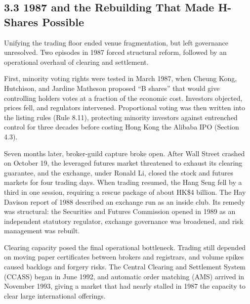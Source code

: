 \documentclass[11pt,letterpaper]{article}
\begin{document}
\subsection*{\texorpdfstring{3.3 1987 and the Rebuilding That Made H-Shares Possible}{3.3 1987 and the Rebuilding That Made H-Shares Possible}}
Unifying the trading floor ended venue fragmentation, but left governance unresolved. Two episodes in 1987 forced structural reform, followed by an operational overhaul of clearing and settlement.

First, minority voting rights were tested in March 1987, when Cheung Kong, Hutchison, and Jardine Matheson proposed ``B shares'' that would give controlling holders votes at a fraction of the economic cost. Investors objected, prices fell, and regulators intervened. Proportional voting was then written into the listing rules (Rule 8.11), protecting minority investors against entrenched control for three decades before costing Hong Kong the Alibaba IPO (Section 4.3).

Seven months later, broker-guild capture broke open. After Wall Street crashed on October 19, the leveraged futures market threatened to exhaust its clearing guarantee, and the exchange, under Ronald Li, closed the stock and futures markets for four trading days. When trading resumed, the Hang Seng fell by a third in one session, requiring a rescue package of about HK\$4 billion. The Hay Davison report of 1988 described an exchange run as an inside club. Its remedy was structural: the Securities and Futures Commission opened in 1989 as an independent statutory regulator, exchange governance was broadened, and risk management was rebuilt.

Clearing capacity posed the final operational bottleneck. Trading still depended on moving paper certificates between brokers and registrars, and volume spikes caused backlogs and forgery risks. The Central Clearing and Settlement System (CCASS) began in June 1992, and automatic order matching (AMS) arrived in November 1993, giving a market that had nearly stalled in 1987 the capacity to clear large international offerings.
\end{document}
